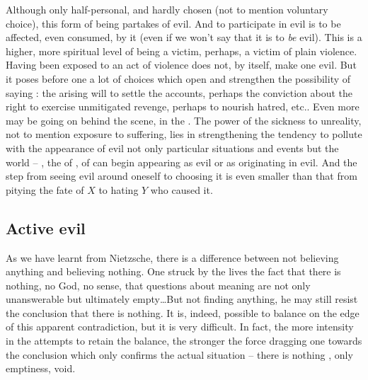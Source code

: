 \pa Although only half-personal, and hardly chosen (not to mention voluntary
choice), this form of being partakes of evil. And to participate in evil is to
be affected, even consumed, by it (even if we won't say that it is to {\em be}
evil). This is a higher, more spiritual level of being a victim, perhaps, a
victim of plain violence. Having been exposed to an act of violence does not, by
itself, make one evil. But it poses before one a lot of choices which open and
strengthen the possibility of saying \No: the arising will to settle the
accounts, perhaps the conviction about the right to exercise unmitigated revenge,
perhaps to nourish hatred, etc..
%
Even more may be going on behind the scene, in the . The
 power of the sickness to unreality, not to mention exposure to
suffering, lies in strengthening the tendency to pollute with the appearance of
evil not only particular situations and events but the world -- , the  of , of 
can begin appearing as evil or as originating in evil. And the step from seeing
evil around oneself to choosing it is even smaller than that from pitying the
fate of $X$ to hating $Y$ who caused it.




\subsection{Active evil}
\pa
As we have learnt from Nietzsche, there is a difference between not believing
anything and believing nothing.
%
One struck by the  lives the fact that there is nothing, no God,
no sense, that questions about meaning are not only unanswerable but
ultimately empty\ldots But not finding anything, he may still resist the
conclusion 
that there is nothing. It is, indeed, possible to balance on the edge of this
apparent contradiction, but it is very difficult. In fact, the more intensity in the
attempts to retain the balance, the stronger the force dragging one towards the
conclusion which only confirms the actual situation -- there is nothing
, only emptiness, void. 

